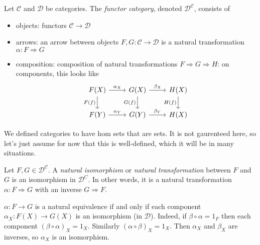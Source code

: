 \documentclass[12pt]{article}
\begin{document}
\begin{definition}
	Let $\mathcal{C}$ and $\mathcal{D}$ be categories. The \emph{functor category}, denoted $\mathcal{D}^\mathcal{C}$, consists of 
	\begin{itemize}
		\item objects: functors $\mathcal{C}\to\mathcal{D}$
		\item arrows: an arrow between objects $F,G:\mathcal{C}\to\mathcal{D}$ is a natural transformation $\alpha: F\Rightarrow G$
		\item composition: composition of natural transformations $F\Rightarrow G\Rightarrow H$: on components, this looks like 
			\begin{equation*}
\begin{tikzcd}
F(X) \arrow[d, "F(f)"'] \arrow[r, "\alpha_X"] & G(X) \arrow[d, "G(f)"'] \arrow[r, "\beta_X"] & H(X) \arrow[d, "H(f)"'] \\
F(Y) \arrow[r, "\alpha_Y"]                    & G(Y) \arrow[r, "\beta_Y"]                    & H(X)                   
\end{tikzcd}
			\end{equation*}
	\end{itemize}
\end{definition}

\begin{remark}
	We defined categories to have hom sets that are sets. It is not gaurenteed here, so let's just assume for now that this is well-defined, which it will be in many situations.
\end{remark}

\begin{definition}
	Let $F,G\in\mathcal{D}^\mathcal{C}$. A \emph{natural isomorphism} or \emph{natural transformation} between $F$ and $G$ is an isomorphism in $\mathcal{D}^C$. In other words, it is a natural transformation $\alpha:F\Rightarrow G$ with an inverse $G\Rightarrow F$.
\end{definition}

\begin{remark}
	$\alpha:F\to G$ is a natural equivalence if and only if each component $\alpha_X:F(X)\to G(X)$ is an isomorphism (in $\mathcal{D}$). Indeed, if $\beta\circ\alpha=1_F$ then each component $(\beta\circ\alpha)_X=1_X$. Similarly $(\alpha\circ\beta)_X=1_X$. Then $\alpha_X$ and $\beta_X$ are inverses, so $\alpha_X$ is an isomorphism.
\end{remark}
\end{document}
